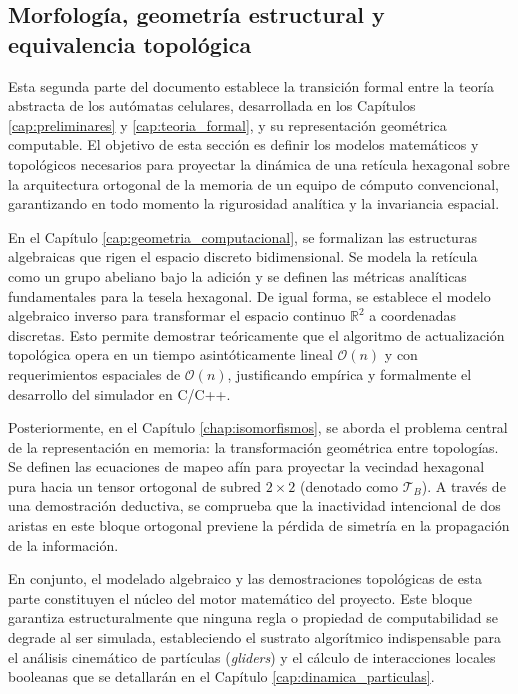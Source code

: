 % 
%
%

\begin{partbacktext}
\part{Morfología, geometría estructural y equivalencia topológica}

\noindent Esta segunda parte del documento establece la transición formal entre la teoría abstracta de los autómatas celulares, desarrollada en los Capítulos \ref{cap:preliminares} y \ref{cap:teoria_formal}, y su representación geométrica computable. El objetivo de esta sección es definir los modelos matemáticos y topológicos necesarios para proyectar la dinámica de una retícula hexagonal sobre la arquitectura ortogonal de la memoria de un equipo de cómputo convencional, garantizando en todo momento la rigurosidad analítica y la invariancia espacial.

En el Capítulo \ref{cap:geometria_computacional}, se formalizan las estructuras algebraicas que rigen el espacio discreto bidimensional. Se modela la retícula como un grupo abeliano bajo la adición y se definen las métricas analíticas fundamentales para la tesela hexagonal. De igual forma, se establece el modelo algebraico inverso para transformar el espacio continuo $\mathbb{R}^2$ a coordenadas discretas. Esto permite demostrar teóricamente que el algoritmo de actualización topológica opera en un tiempo asintóticamente lineal $\mathcal{O}(n)$ y con requerimientos espaciales de $\mathcal{O}(n)$, justificando empírica y formalmente el desarrollo del simulador en C/C++.

Posteriormente, en el Capítulo \ref{chap:isomorfismos}, se aborda el problema central de la representación en memoria: la transformación geométrica entre topologías. Se definen las ecuaciones de mapeo afín para proyectar la vecindad hexagonal pura hacia un tensor ortogonal de subred $2 \times 2$ (denotado como $\mathcal{T}_B$). A través de una demostración deductiva, se comprueba que la inactividad intencional de dos aristas en este bloque ortogonal previene la pérdida de simetría en la propagación de la información. 

En conjunto, el modelado algebraico y las demostraciones topológicas de esta parte constituyen el núcleo del motor matemático del proyecto. Este bloque garantiza estructuralmente que ninguna regla o propiedad de computabilidad se degrade al ser simulada, estableciendo el sustrato algorítmico indispensable para el análisis cinemático de partículas (\textit{gliders}) y el cálculo de interacciones locales booleanas que se detallarán en el Capítulo \ref{cap:dinamica_particulas}.

\end{partbacktext}
